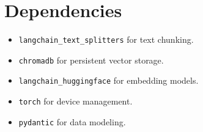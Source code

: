 \documentclass{article}
\begin{document}
\section{Dependencies}
\begin{itemize}
    \item \texttt{langchain\_text\_splitters} for text chunking.
    \item \texttt{chromadb} for persistent vector storage.
    \item \texttt{langchain\_huggingface} for embedding models.
    \item \texttt{torch} for device management.
    \item \texttt{pydantic} for data modeling.
\end{itemize}
\end{document}
